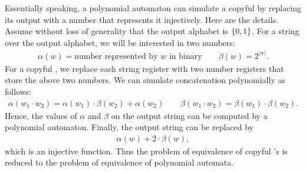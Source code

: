 {

Essentially speaking, a polynomial automaton can simulate a copyful \sst by replacing its output with a number that represents it injectively.  Here are the details.
Assume without loss of generality that the output alphabet is $\{0,1\}$. For a string over the output alphabet, we will be interested in two numbers: 
\begin{align*}
\alpha(w) = \text{number represented by $w$ in binary} \qquad \beta(w) = 2^{|w|}.
\end{align*}
For a copyful \sst, we replace each string register with two number registers that store the above two numbers. We can simulate concatenation polynomially as follows: 
\begin{align*}
\alpha(w_1 \cdot w_2) = \alpha(w_1) \cdot \beta(w_2) + \alpha(w_2) \qquad \beta(w_1 \cdot w_2) = \beta(w_1) \cdot \beta(w_2).
\end{align*}
Hence, the values of $\alpha$ and $\beta$ on the output string can be computed by a polynomial automaton. Finally, the output string can be replaced by 
\begin{align*}
\alpha(w) + 2 \cdot \beta(w),
\end{align*}
which is an injective function. Thus the problem of equivalence of copyful \sst's is reduced to the problem of equivalence of polynomial automata.
}